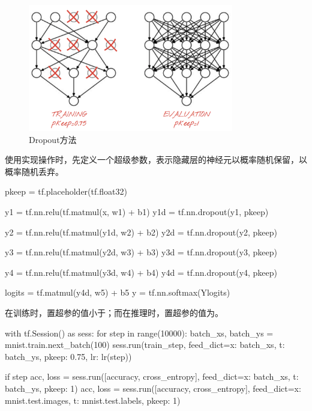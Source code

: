 \begin{content}
\begin{content}
\begin{figure}[H]
\centering
\includegraphics[width=0.8\textwidth]{figures/mnist-dropout.png}
\caption{Dropout方法}
 \label{fig:mnist-dropout}
\end{figure}

使用\tf{}实现操作时，先定义一个超级参数，表示隐藏层的神经元以概率随机保留，以概率随机丢弃。

\begin{leftbar}
\begin{python}
pkeep = tf.placeholder(tf.float32)

y1 = tf.nn.relu(tf.matmul(x,  w1) + b1)
y1d = tf.nn.dropout(y1, pkeep)

y2 = tf.nn.relu(tf.matmul(y1d, w2) + b2)
y2d = tf.nn.dropout(y2, pkeep)

y3 = tf.nn.relu(tf.matmul(y2d, w3) + b3)
y3d = tf.nn.dropout(y3, pkeep)

y4 = tf.nn.relu(tf.matmul(y3d, w4) + b4)
y4d = tf.nn.dropout(y4, pkeep)

logits = tf.matmul(y4d, w5) + b5
y = tf.nn.softmax(Ylogits)
\end{python}
\end{leftbar}

在训练时，置超参的值小于；而在推理时，置超参的值为。

\begin{leftbar}
\begin{python}
with tf.Session() as sess:
  for step in range(10000):
    batch_xs, batch_ys = mnist.train.next_batch(100)
    sess.run(train_step, 
      feed_dict={x: batch_xs, t: batch_ys, pkeep: 0.75, lr: lr(step)})

    if step %
      acc, loss = sess.run([accuracy, cross_entropy], 
        feed_dict={x: batch_xs, t: batch_ys, pkeep: 1})
      acc, loss = sess.run([accuracy, cross_entropy], 
        feed_dict={x: mnist.test.images, t: mnist.test.labels, pkeep: 1})
\end{python}
\end{leftbar}


\end{content}
\end{content}
